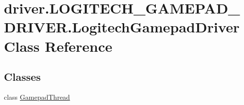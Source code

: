 \hypertarget{classdriver_1_1LOGITECH__GAMEPAD__DRIVER_1_1LogitechGamepadDriver}{}\section{driver.\+L\+O\+G\+I\+T\+E\+C\+H\+\_\+\+G\+A\+M\+E\+P\+A\+D\+\_\+\+D\+R\+I\+V\+E\+R.\+Logitech\+Gamepad\+Driver Class Reference}
\label{classdriver_1_1LOGITECH__GAMEPAD__DRIVER_1_1LogitechGamepadDriver}
\subsection*{Classes}
\begin{DoxyCompactItemize}
\item 
class \hyperlink{classdriver_1_1LOGITECH__GAMEPAD__DRIVER_1_1LogitechGamepadDriver_1_1GamepadThread}{Gamepad\+Thread}
\end{DoxyCompactItemize}
